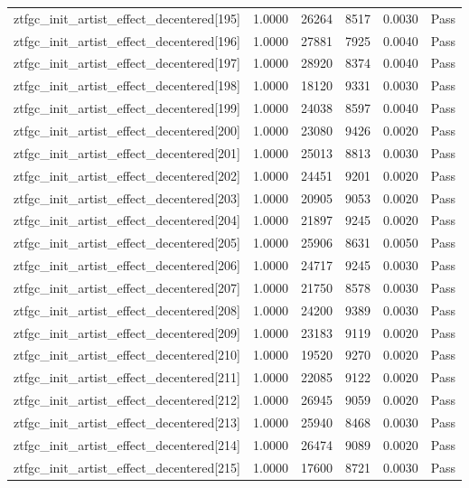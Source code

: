 \begin{table}[htbp]
\begin{tabular}{llrrll}
ztfgc\_init\_artist\_effect\_decentered[195] & 1.0000 & 26264 & 8517 & 0.0030 & Pass \\
ztfgc\_init\_artist\_effect\_decentered[196] & 1.0000 & 27881 & 7925 & 0.0040 & Pass \\
ztfgc\_init\_artist\_effect\_decentered[197] & 1.0000 & 28920 & 8374 & 0.0040 & Pass \\
ztfgc\_init\_artist\_effect\_decentered[198] & 1.0000 & 18120 & 9331 & 0.0030 & Pass \\
ztfgc\_init\_artist\_effect\_decentered[199] & 1.0000 & 24038 & 8597 & 0.0040 & Pass \\
ztfgc\_init\_artist\_effect\_decentered[200] & 1.0000 & 23080 & 9426 & 0.0020 & Pass \\
ztfgc\_init\_artist\_effect\_decentered[201] & 1.0000 & 25013 & 8813 & 0.0030 & Pass \\
ztfgc\_init\_artist\_effect\_decentered[202] & 1.0000 & 24451 & 9201 & 0.0020 & Pass \\
ztfgc\_init\_artist\_effect\_decentered[203] & 1.0000 & 20905 & 9053 & 0.0020 & Pass \\
ztfgc\_init\_artist\_effect\_decentered[204] & 1.0000 & 21897 & 9245 & 0.0020 & Pass \\
ztfgc\_init\_artist\_effect\_decentered[205] & 1.0000 & 25906 & 8631 & 0.0050 & Pass \\
ztfgc\_init\_artist\_effect\_decentered[206] & 1.0000 & 24717 & 9245 & 0.0030 & Pass \\
ztfgc\_init\_artist\_effect\_decentered[207] & 1.0000 & 21750 & 8578 & 0.0030 & Pass \\
ztfgc\_init\_artist\_effect\_decentered[208] & 1.0000 & 24200 & 9389 & 0.0030 & Pass \\
ztfgc\_init\_artist\_effect\_decentered[209] & 1.0000 & 23183 & 9119 & 0.0020 & Pass \\
ztfgc\_init\_artist\_effect\_decentered[210] & 1.0000 & 19520 & 9270 & 0.0020 & Pass \\
ztfgc\_init\_artist\_effect\_decentered[211] & 1.0000 & 22085 & 9122 & 0.0020 & Pass \\
ztfgc\_init\_artist\_effect\_decentered[212] & 1.0000 & 26945 & 9059 & 0.0020 & Pass \\
ztfgc\_init\_artist\_effect\_decentered[213] & 1.0000 & 25940 & 8468 & 0.0030 & Pass \\
ztfgc\_init\_artist\_effect\_decentered[214] & 1.0000 & 26474 & 9089 & 0.0020 & Pass \\
ztfgc\_init\_artist\_effect\_decentered[215] & 1.0000 & 17600 & 8721 & 0.0030 & Pass \\

\end{tabular}
\end{table}
